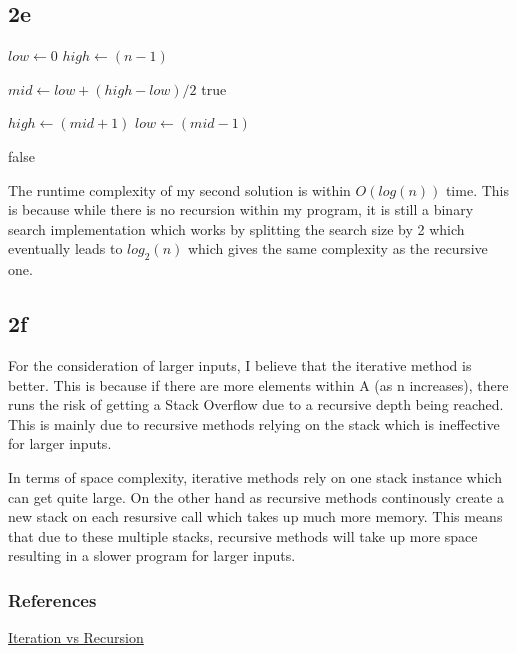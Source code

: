 \documentclass[oneside, a4paper]{article}
\begin{document}
\subsection*{2e}
\begin{algorithmic}
        \State $low \gets 0$
        \State $high \gets (n - 1)$


            \State $mid \gets low + (high - low) / 2$
                \State \Return true    
            \EndIf
                
                \State $high \gets (mid + 1)$
            \Else
                \State $low \gets (mid - 1)$
            \EndIf

        \EndWhile
        \State \Return false    
        
    \EndFunction
\end{algorithmic}

The runtime complexity of my second solution is within $O(log(n))$ time. This is because while there is no recursion within my program, it is still a binary search implementation which works by splitting the search size by 2 which eventually leads to $log_2(n)$ which gives the same complexity as the recursive one.

\subsection*{2f}
For the consideration of larger inputs, I believe that the iterative method is better. This is because if there are more elements within A (as n increases), there runs the risk of getting a Stack Overflow due to a recursive depth being reached. This is mainly due to recursive methods relying on the stack which is ineffective for larger inputs.

In terms of space complexity, iterative methods rely on one stack instance which can get quite large. On the other hand as recursive methods continously create a new stack on each resursive call which takes up much more memory. This means that due to these multiple stacks, recursive methods will take up more space resulting in a slower program for larger inputs.

\subsubsection*{References}
\href{https://medium.com/backticks-tildes/iteration-vs-recursion-c2017a483890}{Iteration vs Recursion}
\end{document}
